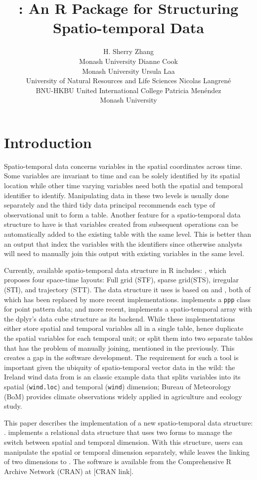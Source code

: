 \documentclass[
]{jss}
\author{
H. Sherry Zhang\\Monash University \And Dianne Cook\\Monash University
\AND Ursula Laa\\University of Natural Resources and Life Sciences
\AND Nicolas Langrené\\BNU-HKBU United International College
\AND Patricia Menéndez\\Monash University \AND
}
\title{\pkg{cubble}: An R Package for Structuring Spatio-temporal Data}
\begin{document}
\newpage

\hypertarget{introduction}{%
\section{Introduction}\label{introduction}}

Spatio-temporal data concerns variables in the spatial coordinates
across time. Some variables are invariant to time and can be solely
identified by its spatial location while other time varying variables
need both the spatial and temporal identifier to identify. Manipulating
data in these two levels is usually done separately and the third tidy
data principal \citep{tidydata} recommends each type of observational
unit to form a table. Another feature for a spatio-temporal data
structure to have is that variables created from subsequent operations
can be automatically added to the existing table with the same level.
This is better than an output that index the variables with the
identifiers since otherwise analysts will need to manually join this
output with existing variables in the same level.

Currently, available spatio-temporal data structure in R includes:
 \citep{spacetime}, which proposes four space-time
layouts: Full grid (STF), sparse grid(STS), irregular (STI), and
trajectory (STT). The data structure it uses is based on 
\citep{sp} and  \citep{xts}, both of which has been replaced by
more recent implementations.  \citep{spatstat} implements
a \texttt{ppp} class for point pattern data; and more recent,
 \citep{stars} implements a spatio-temporal array with the
dplyr's data cube structure  \citep{cubelyr} as its
backend. While these implementations either store spatial and temporal
variables all in a single table, hence duplicate the spatial variables
for each temporal unit; or split them into two separate tables that has
the problem of manually joining, mentioned in the previously. This
creates a gap in the software development. The requirement for such a
tool is important given the ubiquity of spatio-temporal vector data in
the wild: the Ireland wind data from  is an classic example
data that splits variables into its spatial (\texttt{wind.loc}) and
temporal (\texttt{wind}) dimension; Bureau of Meteorology (BoM) provides
climate observations widely applied in agriculture and ecology study.
\newline

This paper describes the implementation of a new spatio-temporal data
structure: .  implements a relational data
structure that uses two forms to manage the switch between spatial and
temporal dimension. With this structure, users can manipulate the
spatial or temporal dimension separately, while leaves the linking of
two dimensions to . The software is available from the
Comprehensive R Archive Network (CRAN) at {[}CRAN link{]}. \newline
\end{document}

